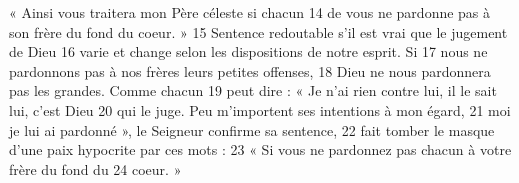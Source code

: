 « Ainsi vous traitera mon Père céleste si chacun	 
14	 	de vous ne pardonne pas à son frère du fond du coeur. »	 
15	 	Sentence redoutable s'il est vrai que le jugement de Dieu	 
16	 	varie et change selon les dispositions de notre esprit. Si	 
17	 	nous ne pardonnons pas à nos frères leurs petites offenses,	 
18	 	Dieu ne nous pardonnera pas les grandes. Comme chacun	 
19	 	peut dire : « Je n'ai rien contre lui, il le sait lui, c'est Dieu	 
20	 	qui le juge. Peu m'importent ses intentions à mon égard,	 
21	 	moi je lui ai pardonné », le Seigneur confirme sa sentence,	 
22	 	fait tomber le masque d'une paix hypocrite par ces mots :	 
23	 	« Si vous ne pardonnez pas chacun à votre frère du fond du	 
24	 	coeur. »